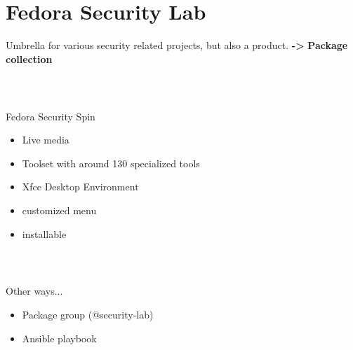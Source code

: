 \section{Fedora Security Lab}
%
\begin{frame}
Umbrella for various security related projects, but also a product.\newline \newline
{\large \textbf{-\textgreater }}\textbf{  Package collection} 
\end{frame}
%
\begin{frame}
\frametitle{\\}
%
{\LARGE Fedora Security Spin \newline}
\begin{itemize}
  \item Live media
  \item Toolset with around 130 specialized tools
  \item Xfce Desktop Environment
  \item customized menu
  \item installable
\end{itemize}
\end{frame}
%
\begin{frame}
\frametitle{\\}
%
{\LARGE Other ways... \newline}
\begin{itemize}
  \item Package group (@security-lab)
  \item Ansible playbook
\end{itemize}
\end{frame}
%
